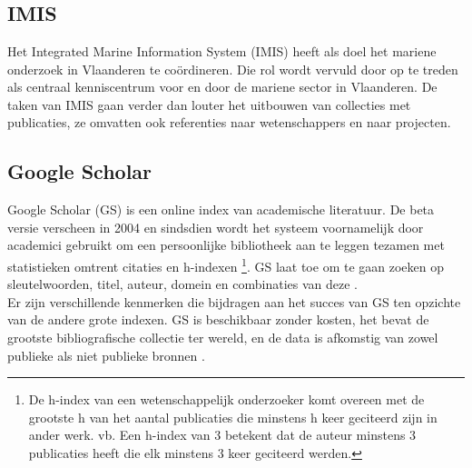 \chapter{}%
\label{ch:stand-van-zaken}


\section{IMIS}
Het Integrated Marine Information System (IMIS) \autocite{Haspeslagh2024} heeft als doel het mariene onderzoek in Vlaanderen te coördineren. Die rol wordt vervuld door op te treden als centraal kenniscentrum voor en door de mariene sector in Vlaanderen. De taken van IMIS gaan verder dan louter het uitbouwen van collecties met publicaties, ze omvatten ook referenties naar wetenschappers en naar projecten.
\section{Google Scholar}
Google Scholar (GS) is een online index van academische literatuur. De beta versie verscheen in 2004 en sindsdien wordt het systeem voornamelijk door academici gebruikt om een persoonlijke bibliotheek aan te leggen tezamen met statistieken omtrent citaties en h-indexen \footnote{De h-index van een wetenschappelijk onderzoeker komt overeen met de grootste h van het aantal publicaties die minstens h keer geciteerd zijn in ander werk. vb. Een h-index van 3 betekent dat de auteur minstens 3 publicaties heeft die elk minstens 3 keer geciteerd werden.}. GS laat toe om te gaan zoeken op sleutelwoorden, titel, auteur, domein en combinaties van deze \autocite{Noruzi2005}.\\
Er zijn verschillende kenmerken die bijdragen aan het succes van GS ten opzichte van de andere grote indexen. GS is beschikbaar zonder kosten, het bevat de grootste bibliografische collectie ter wereld, en de data is afkomstig van zowel publieke als niet publieke bronnen \autocite{Aguillo2011}.
